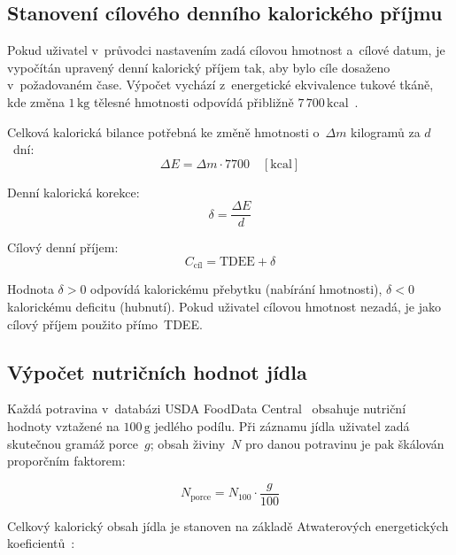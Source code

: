 \subsection{Stanovení cílového denního kalorického příjmu}

Pokud uživatel v~průvodci nastavením zadá cílovou hmotnost a~cílové datum,
je vypočítán upravený denní kalorický příjem tak, aby bylo cíle dosaženo
v~požadovaném čase. Výpočet vychází z~energetické ekvivalence tukové
tkáně, kde změna $1\,\text{kg}$ tělesné hmotnosti odpovídá přibližně
$7\,700\,\text{kcal}$~\cite{hall2008energy}.

Celková kalorická bilance potřebná ke změně hmotnosti o~$\Delta m$
kilogramů za $d$~dní:
\begin{equation}
  \Delta E = \Delta m \cdot 7700 \quad [\text{kcal}]
  \label{eq:delta-e}
\end{equation}

Denní kalorická korekce:
\begin{equation}
  \delta = \frac{\Delta E}{d}
  \label{eq:daily-delta}
\end{equation}

Cílový denní příjem:
\begin{equation}
  C_{\text{cíl}} = \text{TDEE} + \delta
  \label{eq:calorie-goal}
\end{equation}

Hodnota $\delta > 0$ odpovídá kalorickému přebytku (nabírání hmotnosti),
$\delta < 0$ kalorickému deficitu (hubnutí). Pokud uživatel cílovou
hmotnost nezadá, je jako cílový příjem použito přímo~TDEE.

\subsection{Výpočet nutričních hodnot jídla}

Každá potravina v~databázi USDA FoodData Central~\cite{usda2024} obsahuje
nutriční hodnoty vztažené na $100\,\text{g}$ jedlého podílu. Při záznamu
jídla uživatel zadá skutečnou gramáž porce~$g$; obsah živiny~$N$ pro
danou potravinu je pak škálován proporčním faktorem:

\begin{equation}
  N_{\text{porce}} = N_{100} \cdot \frac{g}{100}
  \label{eq:nutrient-scale}
\end{equation}

Celkový kalorický obsah jídla je stanoven na základě Atwaterových
energetických koeficientů~\cite{atwater1902}:

